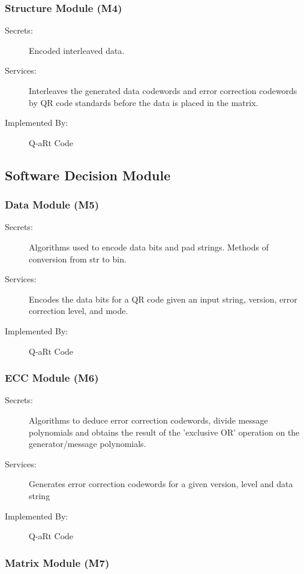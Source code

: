 \documentclass[12pt, titlepage]{article}
\begin{document}
\subsubsection{Structure Module (M4)}

\begin{description}
\item[Secrets:] Encoded interleaved data.
\item[Services:] Interleaves the generated data codewords and error correction codewords by QR code standards before the data is placed in the matrix.
\item[Implemented By:] Q-aRt Code
\end{description}

\subsection{Software Decision Module}

\subsubsection{Data Module (M5)}

\begin{description}
\item[Secrets:] Algorithms used to  encode data bits and pad strings. Methods of conversion from str to bin.
\item[Services:] Encodes the data bits for a QR code given an input string, version, error correction level, and mode.
\item[Implemented By:] Q-aRt Code
\end{description}

\subsubsection{ECC Module (M6)}

\begin{description}
\item[Secrets:] Algorithms to deduce error correction codewords, divide message polynomials and obtains the result of the 'exclusive OR' operation on the generator/message polynomials.
\item[Services:] Generates error correction codewords for a given version, level and data string
\item[Implemented By:] Q-aRt Code
\end{description}

\subsubsection{Matrix Module (M7)}
\end{document}
